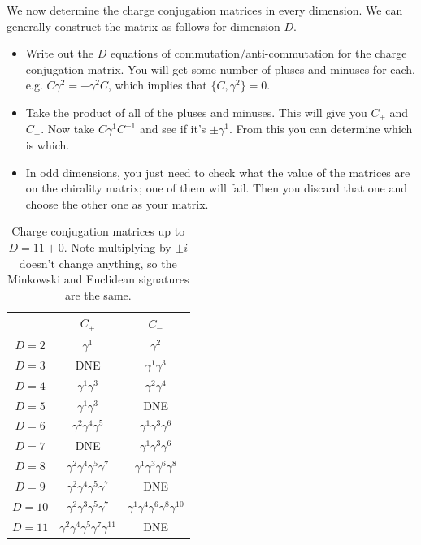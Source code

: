 \documentclass[11pt]{article}
\begin{document}

We now determine the charge conjugation matrices in every dimension.
We can generally construct the matrix as follows for dimension $D$.
\begin{itemize}
    \item Write out the $D$ equations of commutation/anti-commutation
    for the charge conjugation matrix. You will get some number of pluses
    and minuses for each, e.g. $C \gamma^2 = - \gamma^2 C$, which implies
    that $\{ C, \gamma^2 \} = 0$.
    \item Take the product of all of the pluses and minuses. This will give you
    $C_+$ and $C_-$. Now take $C \gamma^1 C^{-1}$ and see if it's $\pm \gamma^1$.
    From this you can determine which is which.
    \item In odd dimensions, you just need to check what the value of the matrices
    are on the chirality matrix; one of them will fail. Then you discard that one
    and choose the other one as your matrix.
\end{itemize}

\begin{table}[H]
    \centering
    \label{table:c_matrices}
    \begin{tabular}{|c|c|c|}
        \hline
        & $C_+$ & $C_-$ \\
        \hline
        $D = 2$ & $\gamma^1$ & $\gamma^2$\\
        $D = 3$ & DNE & $\gamma^1 \gamma^3$\\
        $D = 4$ & $\gamma^1 \gamma^3$ & $\gamma^2 \gamma^4$\\
        $D = 5$ & $\gamma^1 \gamma^3$ & DNE\\
        $D = 6$ & $\gamma^2 \gamma^4 \gamma^5$ & $\gamma^1 \gamma^3 \gamma^6$\\
        $D = 7$ & DNE & $\gamma^1 \gamma^3 \gamma^6$\\
        $D = 8$ & $\gamma^2 \gamma^4 \gamma^5 \gamma^7$ & $\gamma^1 \gamma^3 \gamma^6 \gamma^8$\\
        $D = 9$ & $\gamma^2 \gamma^4 \gamma^5 \gamma^7$ & DNE\\
        $D = 10$ & $\gamma^2 \gamma^3 \gamma^5 \gamma^7$ & $\gamma^1 \gamma^4 \gamma^6 \gamma^8 \gamma^{10}$\\
        $D = 11$ & $\gamma^2 \gamma^4 \gamma^5 \gamma^7 \gamma^{11}$ & DNE\\
        \hline
    \end{tabular}
    \caption{Charge conjugation matrices up to $D = 11 + 0$. Note multiplying
    by $\pm i$ doesn't change anything, so the Minkowski and Euclidean signatures
    are the same.}
\end{table}
\end{document}
